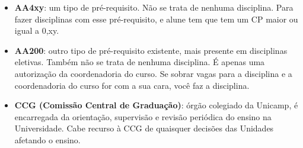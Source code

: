 \begin{itemize}
    \item \textbf{AA4xy}: um tipo de pré-requisito. Não se trata de nenhuma disciplina. Para fazer disciplinas com esse pré-requisito, e alune tem que tem um CP maior ou igual a 0,xy.
    \item \textbf{AA200}: outro tipo de pré-requisito existente, mais presente em disciplinas eletivas. Também não se trata de nenhuma disciplina. É apenas uma autorização da coordenadoria do curso. Se sobrar vagas para a disciplina e a coordenadoria do curso for com a sua cara, você faz a disciplina.
    \item \textbf{CCG (Comissão Central de Graduação)}: órgão colegiado da Unicamp, é encarregada da orientação, supervisão e revisão periódica do ensino na Universidade. Cabe recurso à CCG de quaisquer decisões das Unidades afetando o ensino.
\end{itemize}